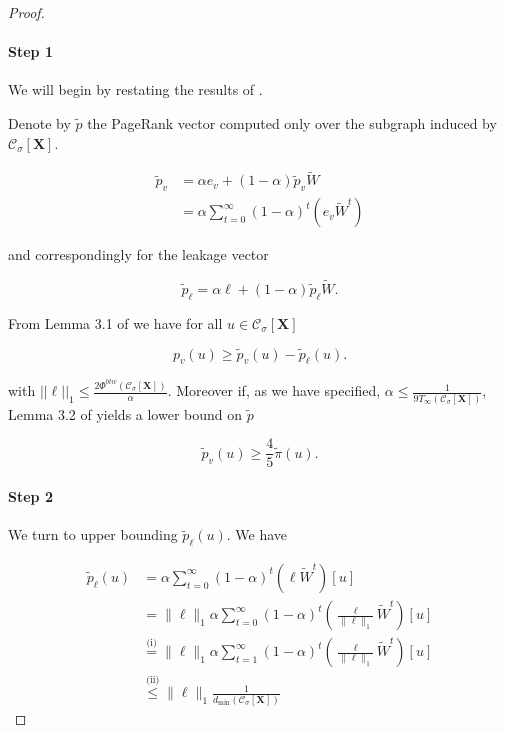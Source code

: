 \documentclass{article}
\newcommand{\1}{\mathbf{1}}
\newcommand{\Xbf}{\mathbf{X}}
\newcommand{\Cset}{\mathcal{C}}
\newcommand{\Csig}{\Cset_{\sigma}}
\theoremstyle{aldenthm}
\begin{document}
\begin{proof}
	\paragraph{Step 1}
	We will begin by restating the results of \cite{zhu2013}.
	
	Denote by $\widetilde{p}$ the PageRank vector computed only over the subgraph induced by $\Csig[\Xbf]$.
	
	\begin{align} \label{eqn: page_rank_body}
	\widetilde{p}_v & = \alpha e_v + (1 - \alpha) \widetilde{p}_v \widetilde{W} \\
	& = \alpha \sum_{t = 0}^{\infty} (1 - \alpha)^t \left(e_v \widetilde{W}^t \right)
	\end{align}
	
	and correspondingly for the leakage vector
	
	\begin{equation*}
	\widetilde{p}_{\ell} = \alpha \ell + (1 - \alpha) \widetilde{p}_{\ell} \widetilde{W}.
	\end{equation*}
	
	From Lemma 3.1 of \cite{zhu2013} we have for all $u \in \Csig[\Xbf]$
	
	\begin{equation*} \label{eqn: zhu_body}
	p_v(u) \geq \widetilde{p}_v(u) - \widetilde{p}_{\ell}(u).
	\end{equation*}
	
	with $||\ell||_1 \leq \frac{2 \Phi^{btw}(\Csig[\Xbf])}{\alpha}$. Moreover if, as we have specified, $\alpha \leq \frac{1}{9 T_{\infty}(\Csig[\Xbf])}$, Lemma 3.2 of \cite{zhu2013} yields a lower bound on $\widetilde{p}$
	
	\begin{equation} \label{eqn: page_rank_mixes}
	\widetilde{p}_v(u) \geq \frac{4}{5} \widetilde{\pi}(u).
	\end{equation}
	
	\paragraph{Step 2}
	
	We turn to upper bounding $\widetilde{p}_{\ell}(u)$. We have
	
	\begin{align} \label{eqn: leakage_page_rank_body}
	\widetilde{p}_{\ell}(u) & = \alpha \sum_{t = 0}^{\infty} (1 - \alpha)^t \left(\ell \widetilde{W}^t \right)[u]  \nonumber \\
	& = \|\ell\|_1 \alpha \sum_{t = 0}^{\infty} (1 - \alpha)^t \left(\frac{\ell}{\|\ell\|_1}  \widetilde{W}^t \right)[u]\nonumber \\
	& \overset{\text{(i)}}{=} \|\ell\|_1 \alpha \sum_{t = 1}^{\infty} (1 - \alpha)^t \left(\frac{\ell}{\|\ell\|_1}  \widetilde{W}^t \right)[u]\nonumber \\
	& \overset{\text{(ii)}}{\leq} \|\ell\|_1 \frac{1}{d_{\min}(\Csig[\Xbf])} 
	\end{align}
	

\end{proof}
\end{document}
